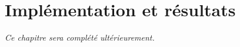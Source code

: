 \documentclass[../main.tex]{subfiles}
\begin{document}
\chapter{Implémentation et résultats}
\label{chap:implementation}

\vspace{2cm}
\begin{center}
\textit{Ce chapitre sera complété ultérieurement.}
\end{center}

\clearpage

\end{document}
